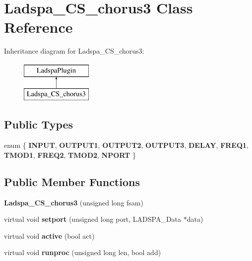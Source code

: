 \hypertarget{class_ladspa___c_s__chorus3}{}\section{Ladspa\+\_\+\+C\+S\+\_\+chorus3 Class Reference}
\label{class_ladspa___c_s__chorus3}
Inheritance diagram for Ladspa\+\_\+\+C\+S\+\_\+chorus3\+:\begin{figure}[H]
\begin{center}
\leavevmode
\includegraphics[height=2.000000cm]{class_ladspa___c_s__chorus3}
\end{center}
\end{figure}
\subsection*{Public Types}
\begin{DoxyCompactItemize}
\item 
\mbox{\label{class_ladspa___c_s__chorus3_aff49d68d5e96dc4a9c49eacd4eb18ff8}} 
enum \{ \newline
{\bfseries I\+N\+P\+UT}, 
{\bfseries O\+U\+T\+P\+U\+T1}, 
{\bfseries O\+U\+T\+P\+U\+T2}, 
{\bfseries O\+U\+T\+P\+U\+T3}, 
\newline
{\bfseries D\+E\+L\+AY}, 
{\bfseries F\+R\+E\+Q1}, 
{\bfseries T\+M\+O\+D1}, 
{\bfseries F\+R\+E\+Q2}, 
\newline
{\bfseries T\+M\+O\+D2}, 
{\bfseries N\+P\+O\+RT}
 \}
\end{DoxyCompactItemize}
\subsection*{Public Member Functions}
\begin{DoxyCompactItemize}
\item 
\mbox{\label{class_ladspa___c_s__chorus3_a28f3807d408390b1839f3aa7a66e7e15}} 
{\bfseries Ladspa\+\_\+\+C\+S\+\_\+chorus3} (unsigned long fsam)
\item 
\mbox{\label{class_ladspa___c_s__chorus3_a6c778be33536247415a6b8b23b042565}} 
virtual void {\bfseries setport} (unsigned long port, L\+A\+D\+S\+P\+A\+\_\+\+Data $\ast$data)
\item 
\mbox{\label{class_ladspa___c_s__chorus3_af8cc07aede4d47d81980f809b2d8470d}} 
virtual void {\bfseries active} (bool act)
\item 
\mbox{\label{class_ladspa___c_s__chorus3_ae8b35e88c7157a7738dfa26cb4c444ef}} 
virtual void {\bfseries runproc} (unsigned long len, bool add)
\end{DoxyCompactItemize}


